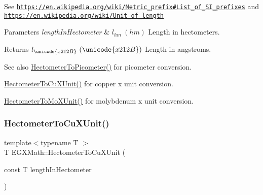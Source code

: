 See \href{https://en.wikipedia.org/wiki/Metric_prefix#List_of_SI_prefixes}{\tt https\+://en.\+wikipedia.\+org/wiki/\+Metric\+\_\+prefix\#\+List\+\_\+of\+\_\+\+S\+I\+\_\+prefixes} and \href{https://en.wikipedia.org/wiki/Unit_of_length}{\tt https\+://en.\+wikipedia.\+org/wiki/\+Unit\+\_\+of\+\_\+length} 
\begin{DoxyParams}{Parameters}
{\em length\+In\+Hectometer} & $ l_{hm}\ (hm)$ Length in hectometers. \\
\hline
\end{DoxyParams}
\begin{DoxyReturn}{Returns}
$ l_{\unicode{x212B}}\ (\unicode{x212B})$ Length in angstroms. 
\end{DoxyReturn}
\begin{DoxySeeAlso}{See also}
\mbox{\hyperlink{group___e_g_x_math-_conversions-_length_conversions-_hectometer-_s_i_gaa45a09cd750ee4e48680332f0ce39f07}{Hectometer\+To\+Picometer()}} for picometer conversion. 

\mbox{\hyperlink{group___e_g_x_math-_conversions-_length_conversions-_hectometer-_non-_s_i_ga5c1d570e3bec185a917f3987d45529be}{Hectometer\+To\+Cu\+X\+Unit()}} for copper x unit conversion. 

\mbox{\hyperlink{group___e_g_x_math-_conversions-_length_conversions-_hectometer-_non-_s_i_gac2840604040746ae9a4c51fd1bb3e6f6}{Hectometer\+To\+Mo\+X\+Unit()}} for molybdenum x unit conversion. 
\end{DoxySeeAlso}
\mbox{\label{group___e_g_x_math-_conversions-_length_conversions-_hectometer-_non-_s_i_ga5c1d570e3bec185a917f3987d45529be}} 
\subsubsection{\texorpdfstring{Hectometer\+To\+Cu\+X\+Unit()}{HectometerToCuXUnit()}}
{\footnotesize\ttfamily template$<$typename T $>$ \\
T E\+G\+X\+Math\+::\+Hectometer\+To\+Cu\+X\+Unit (\begin{DoxyParamCaption}\item[{const T}]{length\+In\+Hectometer }\end{DoxyParamCaption})}



